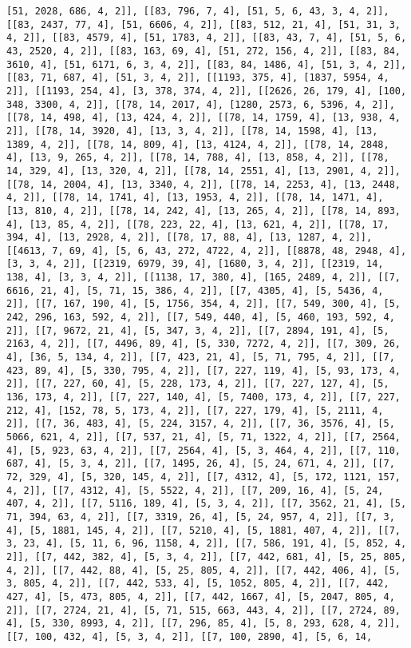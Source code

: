 \documentclass[12pt,fleqn]{article}\usepackage{../../common}
\begin{document}
\begin{verbatim}
[51, 2028, 686, 4, 2]], [[83, 796, 7, 4], [51, 5, 6, 43, 3, 4, 2]], [[83, 2437, 77, 4], [51, 6606, 4, 2]], [[83, 512, 21, 4], [51, 31, 3, 4, 2]], [[83, 4579, 4], [51, 1783, 4, 2]], [[83, 43, 7, 4], [51, 5, 6, 43, 2520, 4, 2]], [[83, 163, 69, 4], [51, 272, 156, 4, 2]], [[83, 84, 3610, 4], [51, 6171, 6, 3, 4, 2]], [[83, 84, 1486, 4], [51, 3, 4, 2]], [[83, 71, 687, 4], [51, 3, 4, 2]], [[1193, 375, 4], [1837, 5954, 4, 2]], [[1193, 254, 4], [3, 378, 374, 4, 2]], [[2626, 26, 179, 4], [100, 348, 3300, 4, 2]], [[78, 14, 2017, 4], [1280, 2573, 6, 5396, 4, 2]], [[78, 14, 498, 4], [13, 424, 4, 2]], [[78, 14, 1759, 4], [13, 938, 4, 2]], [[78, 14, 3920, 4], [13, 3, 4, 2]], [[78, 14, 1598, 4], [13, 1389, 4, 2]], [[78, 14, 809, 4], [13, 4124, 4, 2]], [[78, 14, 2848, 4], [13, 9, 265, 4, 2]], [[78, 14, 788, 4], [13, 858, 4, 2]], [[78, 14, 329, 4], [13, 320, 4, 2]], [[78, 14, 2551, 4], [13, 2901, 4, 2]], [[78, 14, 2004, 4], [13, 3340, 4, 2]], [[78, 14, 2253, 4], [13, 2448, 4, 2]], [[78, 14, 1741, 4], [13, 1953, 4, 2]], [[78, 14, 1471, 4], [13, 810, 4, 2]], [[78, 14, 242, 4], [13, 265, 4, 2]], [[78, 14, 893, 4], [13, 85, 4, 2]], [[78, 223, 22, 4], [13, 621, 4, 2]], [[78, 17, 394, 4], [13, 2928, 4, 2]], [[78, 17, 88, 4], [13, 1287, 4, 2]], [[4613, 7, 69, 4], [5, 6, 43, 272, 4722, 4, 2]], [[8878, 48, 2948, 4], [3, 3, 4, 2]], [[2319, 6979, 39, 4], [1680, 3, 4, 2]], [[2319, 14, 138, 4], [3, 3, 4, 2]], [[1138, 17, 380, 4], [165, 2489, 4, 2]], [[7, 6616, 21, 4], [5, 71, 15, 386, 4, 2]], [[7, 4305, 4], [5, 5436, 4, 2]], [[7, 167, 190, 4], [5, 1756, 354, 4, 2]], [[7, 549, 300, 4], [5, 242, 296, 163, 592, 4, 2]], [[7, 549, 440, 4], [5, 460, 193, 592, 4, 2]], [[7, 9672, 21, 4], [5, 347, 3, 4, 2]], [[7, 2894, 191, 4], [5, 2163, 4, 2]], [[7, 4496, 89, 4], [5, 330, 7272, 4, 2]], [[7, 309, 26, 4], [36, 5, 134, 4, 2]], [[7, 423, 21, 4], [5, 71, 795, 4, 2]], [[7, 423, 89, 4], [5, 330, 795, 4, 2]], [[7, 227, 119, 4], [5, 93, 173, 4, 2]], [[7, 227, 60, 4], [5, 228, 173, 4, 2]], [[7, 227, 127, 4], [5, 136, 173, 4, 2]], [[7, 227, 140, 4], [5, 7400, 173, 4, 2]], [[7, 227, 212, 4], [152, 78, 5, 173, 4, 2]], [[7, 227, 179, 4], [5, 2111, 4, 2]], [[7, 36, 483, 4], [5, 224, 3157, 4, 2]], [[7, 36, 3576, 4], [5, 5066, 621, 4, 2]], [[7, 537, 21, 4], [5, 71, 1322, 4, 2]], [[7, 2564, 4], [5, 923, 63, 4, 2]], [[7, 2564, 4], [5, 3, 464, 4, 2]], [[7, 110, 687, 4], [5, 3, 4, 2]], [[7, 1495, 26, 4], [5, 24, 671, 4, 2]], [[7, 72, 329, 4], [5, 320, 145, 4, 2]], [[7, 4312, 4], [5, 172, 1121, 157, 4, 2]], [[7, 4312, 4], [5, 5522, 4, 2]], [[7, 209, 16, 4], [5, 24, 407, 4, 2]], [[7, 5116, 189, 4], [5, 3, 4, 2]], [[7, 3562, 21, 4], [5, 71, 394, 63, 4, 2]], [[7, 3319, 26, 4], [5, 24, 957, 4, 2]], [[7, 3, 4], [5, 1881, 145, 4, 2]], [[7, 5210, 4], [5, 1881, 407, 4, 2]], [[7, 3, 23, 4], [5, 11, 6, 96, 1158, 4, 2]], [[7, 586, 191, 4], [5, 852, 4, 2]], [[7, 442, 382, 4], [5, 3, 4, 2]], [[7, 442, 681, 4], [5, 25, 805, 4, 2]], [[7, 442, 88, 4], [5, 25, 805, 4, 2]], [[7, 442, 406, 4], [5, 3, 805, 4, 2]], [[7, 442, 533, 4], [5, 1052, 805, 4, 2]], [[7, 442, 427, 4], [5, 473, 805, 4, 2]], [[7, 442, 1667, 4], [5, 2047, 805, 4, 2]], [[7, 2724, 21, 4], [5, 71, 515, 663, 443, 4, 2]], [[7, 2724, 89, 4], [5, 330, 8993, 4, 2]], [[7, 296, 85, 4], [5, 8, 293, 628, 4, 2]], [[7, 100, 432, 4], [5, 3, 4, 2]], [[7, 100, 2890, 4], [5, 6, 14, 
\end{verbatim}
\end{document}
